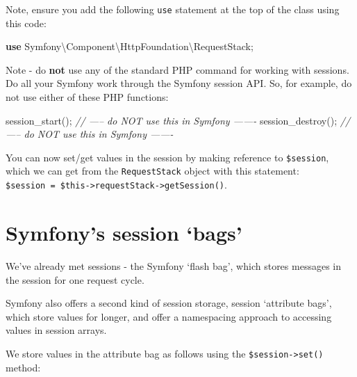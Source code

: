 \documentclass[a4paperpaper,openright]{book}
\newenvironment{Shaded}{}{}
\newcommand{\CommentTok}[1]{\textcolor[rgb]{0.38,0.63,0.69}{\textit{#1}}}
\newcommand{\FunctionTok}[1]{\textcolor[rgb]{0.02,0.16,0.49}{#1}}
\newcommand{\KeywordTok}[1]{\textcolor[rgb]{0.00,0.44,0.13}{\textbf{#1}}}
\newcommand{\NormalTok}[1]{#1}
\newcommand{\OtherTok}[1]{\textcolor[rgb]{0.00,0.44,0.13}{#1}}
\newcommand{\StringTok}[1]{\textcolor[rgb]{0.25,0.44,0.63}{#1}}
\begin{document}
Note, ensure you add the following \texttt{use} statement at the top of
the class using this code:

\begin{Shaded}
\begin{Highlighting}[]
    \KeywordTok{use}\NormalTok{ Symfony\textbackslash{}Component\textbackslash{}HttpFoundation\textbackslash{}RequestStack}\OtherTok{;}
\end{Highlighting}
\end{Shaded}

Note - do \textbf{not} use any of the standard PHP command for working
with sessions. Do all your Symfony work through the Symfony session API.
So, for example, do not use either of these PHP functions:

\begin{Shaded}
\begin{Highlighting}[]
    \FunctionTok{session_start}\OtherTok{();} \CommentTok{// ----- do NOT use this in Symfony -------}
    \FunctionTok{session_destroy}\OtherTok{();} \CommentTok{// ----- do NOT use this in Symfony -------}
\end{Highlighting}
\end{Shaded}

You can now set/get values in the session by making reference to
\texttt{\$session}, which we can get from the \texttt{RequestStack}
object with this statement:
\texttt{\$session\ =\ \$this-\textgreater{}requestStack-\textgreater{}getSession()}.

\hypertarget{symfonys-session-bags}{%
\section{Symfony's session `bags'}\label{symfonys-session-bags}}

We've already met sessions - the Symfony `flash bag', which stores
messages in the session for one request cycle.

Symfony also offers a second kind of session storage, session `attribute
bags', which store values for longer, and offer a namespacing approach
to accessing values in session arrays.

We store values in the attribute bag as follows using the
\texttt{\$session-\textgreater{}set()} method:

\begin{Shaded}
\end{Shaded}
\end{document}
